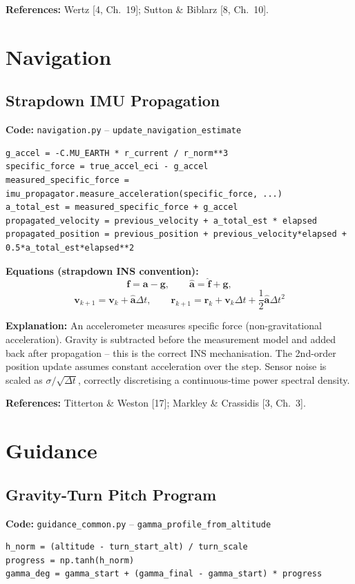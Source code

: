 \documentclass[12pt,a4paper]{article}
\begin{document}
\textbf{References:} Wertz [4, Ch.~19]; Sutton \& Biblarz [8, Ch.~10].

\section{Navigation}

\subsection{Strapdown IMU Propagation}

\textbf{Code:} \texttt{navigation.py} – \texttt{update\_navigation\_estimate}
\begin{verbatim}
g_accel = -C.MU_EARTH * r_current / r_norm**3
specific_force = true_accel_eci - g_accel
measured_specific_force = imu_propagator.measure_acceleration(specific_force, ...)
a_total_est = measured_specific_force + g_accel
propagated_velocity = previous_velocity + a_total_est * elapsed
propagated_position = previous_position + previous_velocity*elapsed + 0.5*a_total_est*elapsed**2
\end{verbatim}

\textbf{Equations (strapdown INS convention):}
\[
\mathbf{f} = \mathbf{a} - \mathbf{g},\qquad
\hat{\mathbf{a}} = \hat{\mathbf{f}} + \mathbf{g},
\]
\[
\mathbf{v}_{k+1} = \mathbf{v}_k + \hat{\mathbf{a}}\Delta t,\qquad
\mathbf{r}_{k+1} = \mathbf{r}_k + \mathbf{v}_k\Delta t + \frac{1}{2}\hat{\mathbf{a}}\Delta t^2
\]

\textbf{Explanation:} An accelerometer measures specific force (non-gravitational acceleration). Gravity is subtracted before the measurement model and added back after propagation -- this is the correct INS mechanisation. The 2nd-order position update assumes constant acceleration over the step. Sensor noise is scaled as $\sigma/\sqrt{\Delta t}$, correctly discretising a continuous-time power spectral density.

\textbf{References:} Titterton \& Weston [17]; Markley \& Crassidis [3, Ch.~3].

\section{Guidance}

\subsection{Gravity-Turn Pitch Program}

\textbf{Code:} \texttt{guidance\_common.py} – \texttt{gamma\_profile\_from\_altitude}
\begin{verbatim}
h_norm = (altitude - turn_start_alt) / turn_scale
progress = np.tanh(h_norm)
gamma_deg = gamma_start + (gamma_final - gamma_start) * progress
\end{verbatim}
\end{document}
